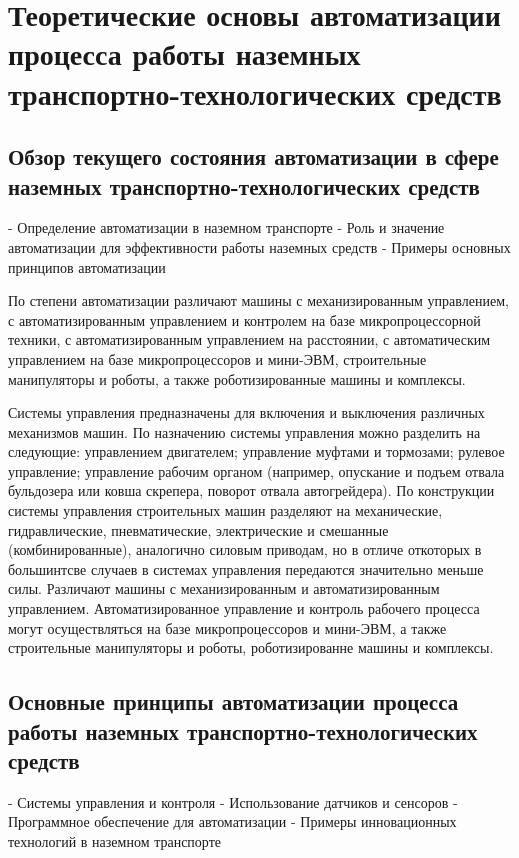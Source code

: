 \chapter{Теоретические основы автоматизации процесса работы наземных транспортно-технологических средств}\label{ch:ch1}

\section{Обзор текущего состояния автоматизации в сфере наземных транспортно-технологических средств}\label{sec:ch1/sec1}

- Определение автоматизации в наземном транспорте
- Роль и значение автоматизации для эффективности работы наземных средств
- Примеры основных принципов автоматизации

По степени автоматизации различают машины с механизированным управлением, с автоматизированным управлением и контролем на базе микропроцессорной техники, с автоматизированным управлением на расстоянии, с автоматическим управлением на базе микропроцессоров и мини-ЭВМ, строительные манипуляторы и роботы, а также роботизированные машины и комплексы. \cite[с.~39]{Evtukov}

\cite[с.~109]{Evtukov}
Системы управления предназначены для включения и выключения различных механизмов машин.
По назначению системы управления можно разделить на следующие: управлением двигателем; управление муфтами и тормозами; рулевое управление; управление рабочим органом (например, опускание и подъем отвала бульдозера или ковша скрепера, поворот отвала автогрейдера).
По конструкции системы управления строительных машин разделяют на механические, гидравлические, пневматические, электрические и смешанные (комбинированные), аналогично силовым приводам, но в отличе откоторых в большинтсве случаев в системах управления передаются значительно меньше силы.
Различают машины с механизированным и автоматизированным управлением. Автоматизированное управление и контроль рабочего процесса могут осуществляться на базе микропроцессоров и мини-ЭВМ, а также строительные манипуляторы и роботы, роботизированне машины и комплексы.

\section{Основные принципы автоматизации процесса работы наземных транспортно-технологических средств}\label{sec:ch1/sec2}

- Системы управления и контроля
- Использование датчиков и сенсоров
- Программное обеспечение для автоматизации
- Примеры инновационных технологий в наземном транспорте

